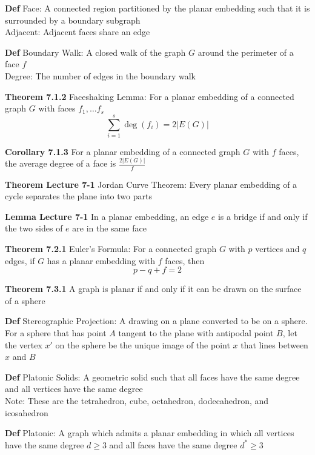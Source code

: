 \documentclass[11pt,notitlepage]{report}
\newcommand{\tbf}[1]{\textbf{#1}}
\begin{document}
\tbf{Def} Face: A connected region partitioned by the planar embedding such that it is surrounded by a boundary subgraph\\
\hspace*{5mm} Adjacent: Adjacent faces share an edge

\tbf{Def} Boundary Walk: A closed walk of the graph $G$ around the perimeter of a face $f$\\
\hspace*{5mm} Degree: The number of edges in the boundary walk

\tbf{Theorem 7.1.2} Faceshaking Lemma: For a planar embedding of a connected graph $G$ with faces $f_1, \dots f_s$
\vspace{-4mm}
$$\sum_{i=1}^s \deg(f_i) = 2|E(G)|$$
\vspace{-6mm}

\tbf{Corollary 7.1.3} For a planar embedding of a connected graph $G$ with $f$ faces, the average degree of a face is $\frac{2|E(G)|}{f}$

\tbf{Theorem Lecture 7-1} Jordan Curve Theorem: Every planar embedding of a cycle separates the plane into two parts

\tbf{Lemma Lecture 7-1} In a planar embedding, an edge $e$ is a bridge if and only if the two sides of $e$ are in the same face

\tbf{Theorem 7.2.1} Euler's Formula: For a connected graph $G$ with $p$ vertices and $q$ edges, if $G$ has a planar embedding with $f$ faces, then
\vspace{-2mm}
$$p-q+f=2$$
\vspace{-8mm}

\tbf{Theorem 7.3.1} A graph is planar if and only if it can be drawn on the surface of a sphere

\tbf{Def} Stereographic Projection: A drawing on a plane converted to be on a sphere. For a sphere that has point $A$ tangent to the plane with antipodal point $B$, let the vertex $x'$ on the sphere be the unique image of the point $x$ that lines between $x$ and $B$

\tbf{Def} Platonic Solids: A geometric solid such that all faces have the same degree and all vertices have the same degree\\
\hspace*{5mm} Note: These are the tetrahedron, cube, octahedron, dodecahedron, and icosahedron

\tbf{Def} Platonic: A graph which admits a planar embedding in which all vertices have the same degree $d \geq 3$ and all faces have the same degree $d^* \geq 3$
\end{document}
